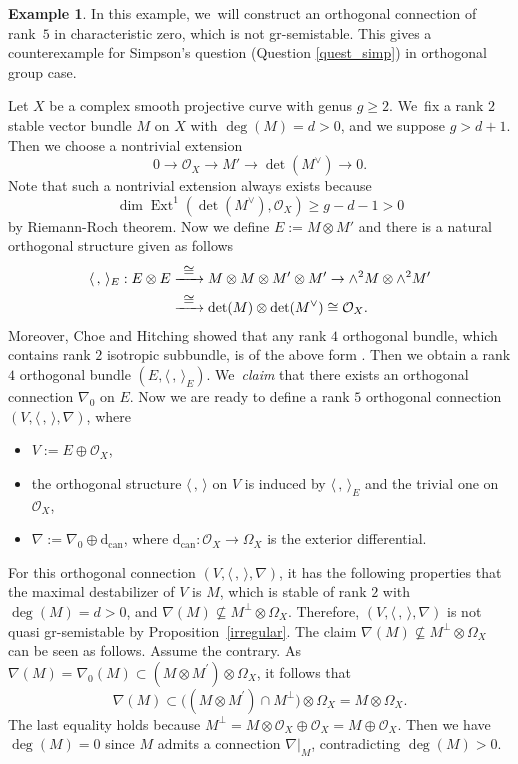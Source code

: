 \documentclass[JEP,XML,SOM,Unicode,published]{cedram}
\newcommand\To[1]{\mathchoice{\xrightarrow{\textstyle\kern4pt#1\kern3pt}}{\stackrel{#1}{\to}}{}{}}
\newcommand{\grsemistable}{gr\nobreakdash-semi\-stable\xspace}
\DeclareMathOperator{\Ext}{Ext}
\theoremstyle{plain}
\theoremstyle{definition}
\newtheorem{examp}[thm]{Example}
\begin{document}
\begin{examp}\label{exmp_char_zero}
In this example, we~will construct an orthogonal connection of rank~$5$ in characteristic zero, which is not \grsemistable. This gives a counterexample for Simpson's question (Question \ref{quest_simp}) in orthogonal group case.

Let $X$ be a complex smooth projective curve with genus $g \geq 2$. We~fix a rank $2$ stable vector bundle $M$ on $X$ with $\deg(M)=d>0$, and we suppose $g > d+1$. Then we choose a nontrivial extension
\[
0 \to \mathcal{O}_X \to M' \to \det(M^{\vee}) \to 0.
\]
Note that such a nontrivial extension always exists because
\[
\dim \Ext^1(\det(M^{\vee}), \mathcal{O}_X ) \geq g-d-1 > 0
\]
by Riemann-Roch theorem. Now we define $E := M \otimes M'$ and there is a natural orthogonal structure given as follows
\begin{align*}
\langle \,, \, \rangle_E : E \otimes E & \To{\cong} M \otimes M \otimes M' \otimes M' \to \wedge^2 M \otimes \wedge^2 M' \\
& \To{\cong} \det(M) \otimes \det(M^{\vee}) \cong \mathcal{O}_X.
\end{align*}
Moreover, Choe and Hitching showed that any rank $4$ orthogonal bundle, which contains rank $2$ isotropic subbundle, is of the above form \cite[Th.\,4.2]{CH23}. Then we obtain a rank $4$ orthogonal bundle $(E, \langle \,, \, \rangle_E)$. We~\emph{claim} that there exists an orthogonal connection $\nabla_0$ on $E$. Now we are ready to define a rank $5$ orthogonal connection $(V, \langle \,, \, \rangle, \nabla)$, where
\begin{itemize}
\item $V:= E \oplus \mathcal{O}_X$,
\item the orthogonal structure $\langle \,, \, \rangle$ on $V$ is induced by $\langle \,, \, \rangle_E$ and the trivial one on $\mathcal{O}_X$,
\item $\nabla:=\nabla_0 \oplus \mathrm{d}_\mathrm{can}$, where $\mathrm{d}_\mathrm{can}: \mathcal{O}_X \to \Omega_X$ is the exterior differential.
\end{itemize}
For this orthogonal connection $(V, \langle \,, \, \rangle, \nabla)$, it has the following properties that the maximal destabilizer of $V$ is $M$, which is stable of rank $2$ with $\deg (M) =d > 0$, and $\nabla(M) \nsubseteq M^{\perp} \otimes \Omega_X$. Therefore, $(V, \langle \,, \, \rangle, \nabla)$ is not quasi \grsemistable by Proposition~\ref{irregular}. The claim $\nabla(M) \nsubseteq M^{\perp} \otimes \Omega_X$ can be seen as follows. Assume the contrary. As~$\nabla(M)=\nabla_0(M)\subset (M\otimes M^\prime)\otimes \Omega_X$, it follows that
\[
\nabla(M)\subset \big((M\otimes M^\prime)\cap M^{\perp}\big)\otimes \Omega_X=M\otimes \Omega_X.
\]
The last equality holds because $M^{\perp}=M\otimes \mathcal{O}_X\oplus \mathcal{O}_X=M\oplus \mathcal{O}_X$. Then we have $\deg(M)=0$ since $M$ admits a connection $\nabla|_{M}$, contradicting $\deg(M)>0$.


\end{examp}
\end{document}
